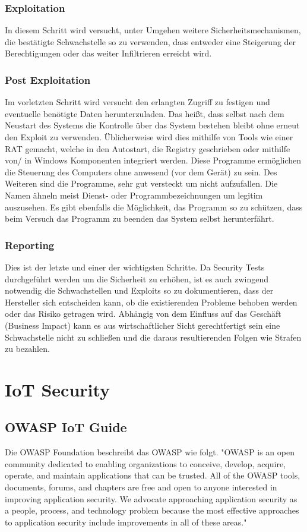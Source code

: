     \subsubsection{\glqq Exploitation\grqq{}}
        In diesem Schritt wird versucht, unter Umgehen weitere Sicherheitsmechanismen, die bestätigte Schwachstelle so zu verwenden, dass entweder eine Steigerung der Berechtigungen oder das weiter Infiltrieren erreicht wird.
        \subsubsection{\glqq Post Exploitation\grqq{}}
        Im vorletzten Schritt wird versucht den erlangten Zugriff zu festigen und eventuelle benötigte Daten herunterzuladen. Das heißt, dass selbst nach dem Neustart des Systems die Kontrolle über das System bestehen bleibt ohne erneut den Exploit zu verwenden. Üblicherweise wird dies mithilfe von Tools wie einer \ac{RAT} gemacht, welche in den Autostart, die Registry geschrieben oder mithilfe von/ in Windows Komponenten integriert werden.
        Diese Programme ermöglichen die Steuerung des Computers ohne anwesend (vor dem Gerät) zu sein. Des Weiteren sind die Programme, sehr gut versteckt um nicht aufzufallen. Die Namen ähneln meist Dienst- oder Programmbezeichnungen um legitim auszusehen. Es gibt ebenfalls die Möglichkeit, das Programm so zu schützen, dass beim Versuch das Programm zu beenden das System selbst herunterfährt.
    \subsubsection{\glqq Reporting\grqq{}}
        Dies ist der letzte und einer der wichtigsten Schritte. Da Security Tests durchgeführt werden um die Sicherheit zu erhöhen, ist es auch zwingend notwendig die Schwachstellen und Exploits so zu dokumentieren, dass der Hersteller sich entscheiden kann, ob die existierenden Probleme behoben werden oder das Risiko getragen wird. Abhängig von dem Einfluss auf das Geschäft (Business Impact) kann es aus wirtschaftlicher Sicht gerechtfertigt sein eine Schwachstelle nicht zu schließen und die daraus resultierenden Folgen wie Strafen zu bezahlen.

\section{IoT Security}
    \subsection{OWASP IoT Guide}
    Die OWASP Foundation \cite{guzman_2019} beschreibt das \ac{OWASP} wie folgt.
    "OWASP is an open community dedicated to enabling organizations to conceive, develop, acquire, operate, and maintain applications that can be trusted. All of the OWASP tools, documents, forums, and chapters are free and open to anyone interested in improving application security. We advocate approaching application security as a people, process, and technology problem because the most effective approaches to application security include improvements in all of these areas."
    

